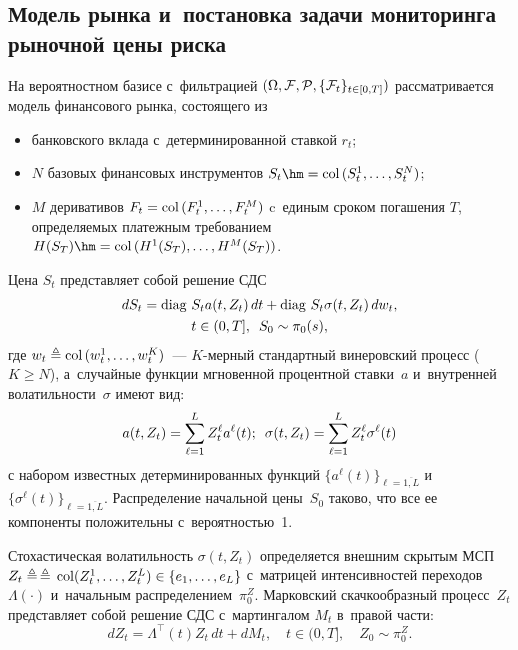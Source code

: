 \begin{multicols}{2}
\section{Модель рынка и~постановка задачи мониторинга рыночной цены риска}

На вероятностном базисе с~фильтрацией $(\Omega, {\mathcal F}, {\mathcal P}, \{{\mathcal F}_t\}_{t \in 
[0,T]})$ рассматривается модель финансового рынка, состоящего из
\begin{itemize}
\item
банковского вклада с~детерминированной ставкой $r_t$;
\item
$N$ базовых финансовых инструментов $S_t \hm= \col\,(S_t^1,\ldots,S_t^N)$;
\item
$M$ деривативов $F_t = \mathop{\mathrm{col}}\,(F_t^1,\ldots,F_t^M)$ c~единым сроком погашения $T$, 
опре\-де\-ля\-емых платежным требованием $H(S_T)\hm = \col\,(H^1(S_T),\ldots,H^M(S_T))$.
\end{itemize}

Цена $S_t $  представляет собой решение СДС
  \begin{multline}
  dS_t = \mathop{\mathrm{diag}\,} S_t a(t,Z_t)\,dt + \mathop{\mathrm{diag}\,} S_t \sigma(t,Z_t)\,dw_t,\\ 
  t \in (0,T], \enskip S_0 \sim \pi_0(s),
  \label{eq:S_sys_P}
  \end{multline}
  где $w_t \triangleq \mathop{\mathrm{col}}\,(w_t^1,\ldots,w_t^K)$~--- $K$-мерный стандартный винеровский 
процесс ($K \geqslant N$), а~случайные функции мгновенной процентной ставки~$a$ и~внутренней волатильности~$\sigma$  
имеют вид:
  $$
  a(t,Z_t) = \sum\limits_{\ell=1}^L Z_t^{\ell} a^{\ell}(t);\enskip \sigma(t,Z_t) = 
\sum\limits_{\ell=1}^L Z_t^{\ell}  \sigma^{\ell}(t)
$$
с набором известных детерминированных функций 
$\{a^{\ell}(t)\}_{\ell=\overline{1,L}}$  и~$\{\sigma^{\ell}(t)\}_{\ell=\overline{1,L}}$. Распределение начальной цены~$S_0$ 
таково, что все ее компоненты положительны с~ве\-ро\-ят\-ностью~1.

Стохастическая волатильность $\sigma(t,Z_t)$ определяется внешним скрытым МСП 
$Z_t \triangleq$\linebreak $\triangleq\,\mathop{\mathrm{col}}(Z_t^1, \ldots, Z_t^L) \in \{e_1,\ldots, e_L\}$  с~мат\-ри\-цей 
\mbox{интенсивностей} переходов~$\Lambda(\cdot)$ и~начальным распределением~$\pi_0^Z$. 
Марковский скачкообразный процесс~$Z_t$ представляет собой решение СДС с~мартингалом $M_t$ в~правой части:
\begin{equation}
  dZ_t = \Lambda^{\top}(t)Z_t\,dt + dM_t,\quad t \in (0,T], \quad Z_0 \sim 
\pi_0^Z.
  \label{eq:Z_sys}
  \end{equation}


\end{multicols}

